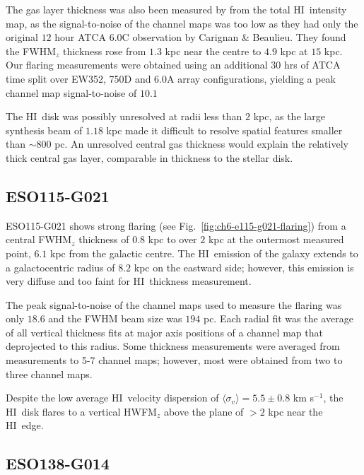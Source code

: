 \documentclass[traditabstract]{aa} %
\newcommand\HI{H{\small I}}
\newcommand\kms{km s$^{-1}$}
\begin{document}
 The gas layer thickness was also been measured by
\citet{vdkjvkf2001} from the total \HI\ intensity map, as the signal-to-noise
of the channel maps was too low as they had only the original $12$ hour ATCA
6.0C observation by Carignan \& Beaulieu. They found the
FWHM$_z$ thickness rose from $1.3$ kpc near
the centre to $4.9$ kpc at $15$ kpc. Our flaring measurements were obtained
using an additional $30$ hrs of ATCA time split over EW352, 750D and
6.0A array configurations, yielding a peak channel map signal-to-noise
of $10.1$

The \HI\ disk was possibly unresolved at radii less than $2$ kpc,
as the large synthesis beam of $1.18$ kpc made it difficult to
resolve spatial features smaller than $\sim$800 pc. An unresolved
central gas thickness would explain the relatively thick central gas
layer, comparable in thickness to the stellar disk.



\subsection{ESO115-G021}

ESO115-G021 shows strong flaring (see Fig.~\ref{fig:ch6-e115-g021-flaring})
from a central FWHM$_z$ thickness of
$0.8$ kpc to over $2$ kpc at the outermost measured point, $6.1$ kpc
from the galactic centre. The \HI\ emission of the galaxy extends
to a galactocentric radius of $8.2$ kpc on the eastward side;
however, this emission is very diffuse and too faint for \HI\ thickness measurement.

The peak signal-to-noise of the channel maps used to measure the
flaring was only $18.6$ and the FWHM beam size was $194$ pc. Each
radial fit was the average of all vertical thickness fits at major
axis positions of a channel map that deprojected to this radius. Some
thickness measurements were averaged from measurements to 5-7 channel maps; 
however, most were obtained from two to three channel maps.

Despite the low average \HI\ velocity dispersion of $\langle \sigma_v
\rangle = 5.5 \pm 0.8$ \kms, the \HI\ disk flares to a vertical
HWFM$_z$ above the plane of $> 2$ kpc near the \HI\ edge.


\subsection{ESO138-G014}
\label{subsection:ESO138-G014}
\end{document}
